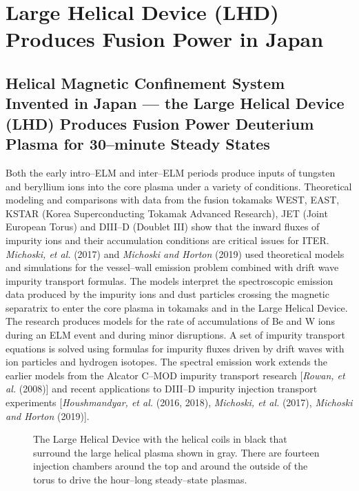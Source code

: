 \documentclass[a4paper,openany,12pt]{report}
\begin{document}
\section{Large Helical Device (LHD) Produces Fusion Power in Japan}

\subsection{Helical Magnetic Confinement System Invented in Japan --- the Large Helical Device (LHD) Produces Fusion Power Deuterium Plasma for 30--minute Steady States}

Both the early intro--ELM and inter--ELM periods produce inputs of tungsten and beryllium ions into the core plasma under a variety of conditions. Theoretical modeling and comparisons with data from the fusion tokamaks WEST, EAST, KSTAR (Korea Superconducting Tokamak Advanced Research), JET (Joint European Torus) and DIII--D (Doublet III) show that the inward fluxes of impurity ions and their accumulation conditions are critical issues for ITER. \emph{Michoski, et al.} (2017) and \emph{Michoski and Horton} (2019) used theoretical models and simulations for the vessel--wall emission problem combined with drift wave impurity transport formulas. The models interpret the spectroscopic emission data produced by the impurity ions and dust particles crossing the magnetic separatrix to enter the core plasma in tokamaks and in the Large Helical Device. The research produces models for the rate of accumulations of Be and W ions during an ELM event and during minor disruptions. A set of impurity transport equations is solved using formulas for impurity fluxes driven by drift waves with ion particles and hydrogen isotopes. The spectral emission work extends the earlier models from the Alcator C--MOD impurity transport research [\emph{Rowan, et al.} (2008)] and recent applications to DIII--D impurity injection transport experiments [\emph{Houshmandyar, et al.} (2016, 2018), \emph{Michoski, et al.} (2017), \emph{Michoski and Horton} (2019)].
%
\begin{figure}[H]
\renewcommand{\thefigure}{4.1}
\centerline{}
\caption{The Large Helical Device with the helical coils in black that surround the large helical plasma shown in gray. There are fourteen injection chambers around the top and around the outside of the torus to drive the hour--long steady--state plasmas.}
\label{F6.3}
\end{figure}
%
\end{document}
